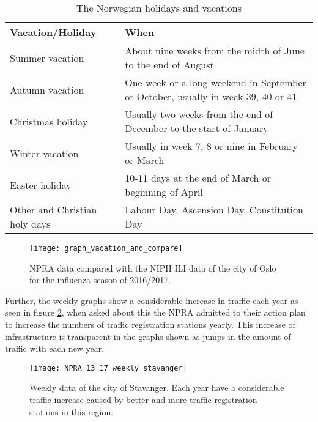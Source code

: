 \begin{center}
\begin{table}[!h]
\begin{tabular}{ | m{9em} | m{10cm}| }
 \hline
 \textbf{Vacation/Holiday} & \textbf{When} \\ [0.5ex] 
 \hline
 Summer vacation & About nine weeks from the midth of June to the end of August  \\ 
 \hline 
 Autumn vacation & One week or a long weekend in September or October, usually in week 39, 40 or 41.\\ 
 \hline
 Christmas holiday & Usually two weeks from the end of December to the start of January\\ 
 \hline
 Winter vacation & Usually in week 7, 8 or nine in February or March \\ 
  \hline
 Easter holiday & 10-11 days at the end of March or beginning of April \\ 
  \hline
 Other and Christian holy days & Labour Day, Ascension Day, Constitution Day \\ 
  \hline
\end{tabular}
\caption{The Norwegian holidays and vacations}
 \label{table:jesus}
\end{table}
\end{center}

\begin{figure}[!htb]
\texttt{[image: graph\_vacation\_and\_compare]}
\centering
\caption{NPRA data compared with the NIPH ILI data of the city of Oslo for the influenza season of 2016/2017.}
\label{fig:graph_vacation_and_compare}
\end{figure}

Further, the weekly graphs show a considerable increase in traffic each year as seen in figure \ref{fig:weeklystavanger}, when asked about this the NPRA admitted to their action plan to increase the numbers of traffic registration stations yearly. This increase of infrastructure is transparent in the graphs shown as jumps in the amount of traffic with each new year. 

\begin{figure}[!htb]
\texttt{[image: NPRA\_13\_17\_weekly\_stavanger]}
\centering
\caption{Weekly data of the city of Stavanger. Each year have a considerable traffic increase caused by better and more traffic registration stations in this region.}
\label{fig:weeklystavanger}
\end{figure}









